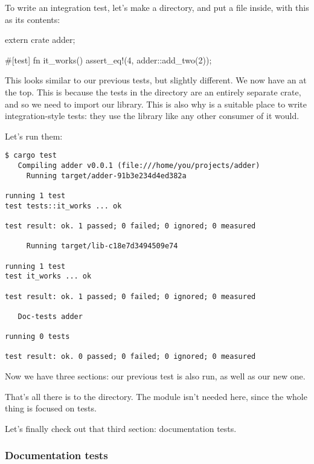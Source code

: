 To write an integration test, let's make a  directory, and put a  file inside, with this as its contents:

\begin{rustc}
extern crate adder;

#[test]
fn it_works() {
    assert_eq!(4, adder::add_two(2));
}
\end{rustc}

This looks similar to our previous tests, but slightly different. We now have an  at the top. This is 
because the tests in the  directory are an entirely separate crate, and so we need to import our library. This is also 
why  is a suitable place to write integration-style tests: they use the library like any other consumer of it would.

\blank

Let's run them:

\begin{verbatim}
$ cargo test
   Compiling adder v0.0.1 (file:///home/you/projects/adder)
     Running target/adder-91b3e234d4ed382a

running 1 test
test tests::it_works ... ok

test result: ok. 1 passed; 0 failed; 0 ignored; 0 measured

     Running target/lib-c18e7d3494509e74

running 1 test
test it_works ... ok

test result: ok. 1 passed; 0 failed; 0 ignored; 0 measured

   Doc-tests adder

running 0 tests

test result: ok. 0 passed; 0 failed; 0 ignored; 0 measured
\end{verbatim}

Now we have three sections: our previous test is also run, as well as our new one.

\blank

That's all there is to the  directory. The  module isn't needed here, since the whole thing is focused on tests.

\blank

Let's finally check out that third section: documentation tests.

\subsubsection*{Documentation tests}

